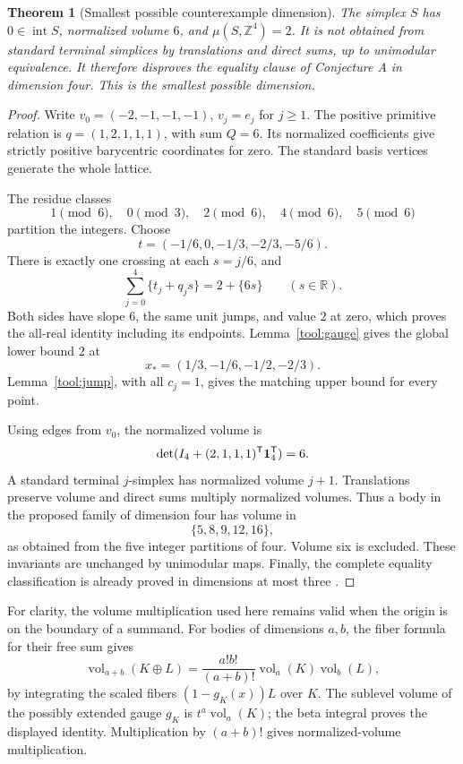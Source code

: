 \documentclass[11pt,a4paper]{article}
\newtheorem{theorem}{Theorem}[section]
\theoremstyle{remark}\newtheorem{remark}[theorem]{Remark}
\DeclareMathOperator{\vol}{vol}
\DeclareMathOperator{\inter}{int}
\newcommand{\R}{\mathbb R}\newcommand{\Z}{\mathbb Z}
\begin{document}
\begin{theorem}[Smallest possible counterexample dimension]\label{thm:S4}
The simplex $S$ has $0\in\inter S$, normalized volume $6$, and
$\mu(S,\Z^4)=2$. It is not obtained from standard terminal simplices
by translations and direct sums, up to unimodular equivalence.
It therefore disproves the equality clause of Conjecture A in
dimension four. This is the smallest possible dimension.
\end{theorem}
\begin{proof}
Write $v_0=(-2,-1,-1,-1)$, $v_j=e_j$ for $j\ge1$. The positive
primitive relation is $q=(1,2,1,1,1)$, with sum $Q=6$. Its normalized
coefficients give strictly positive barycentric coordinates for zero.
The standard basis vertices generate the whole lattice.

The residue classes
\[
 1\pmod6,\quad0\pmod3,\quad2\pmod6,\quad4\pmod6,\quad5\pmod6
\]
partition the integers. Choose
\[
 t=(-1/6,0,-1/3,-2/3,-5/6).
\]
There is exactly one crossing at each $s=j/6$, and
\begin{equation}\label{eq:S4cert}
 \sum_{j=0}^4\{t_j+q_js\}=2+\{6s\}\qquad(s\in\R).
\end{equation}
Both sides have slope $6$, the same unit jumps, and value $2$ at zero,
which proves the all-real identity including its endpoints.
Lemma~\ref{tool:gauge} gives the global lower bound $2$ at
\[
 x_*=(1/3,-1/6,-1/2,-2/3).
\]
Lemma~\ref{tool:jump}, with all $c_j=1$, gives the matching upper bound
for every point.

Using edges from $v_0$, the normalized volume is
\[
 \det(I_4+(2,1,1,1)^{\mathsf T}\mathbf1_4^{\mathsf T})=6.
\]
A standard terminal $j$-simplex has normalized volume $j+1$.
Translations preserve volume and direct sums multiply normalized
volumes. Thus a body in the proposed family of dimension four has
volume in
\[
 \{5,8,9,12,16\},
\]
as obtained from the five integer partitions of four. Volume six is
excluded. These invariants are unchanged by unimodular maps.
Finally, the complete equality classification is already proved
in dimensions at most three \cite[Theorem 1.3]{CSS}.
\end{proof}

For clarity, the volume multiplication used here remains valid when
the origin is on the boundary of a summand. For bodies of dimensions
$a,b$, the fiber formula for their free sum gives
\[
 \vol_{a+b}(K\oplus L)
 =\frac{a!b!}{(a+b)!}\vol_a(K)\vol_b(L),
\]
by integrating the scaled fibers $(1-g_K(x))L$ over $K$.
The sublevel volume of the possibly extended gauge $g_K$ is
$t^a\vol_a(K)$; the beta integral proves the displayed identity.
Multiplication by $(a+b)!$ gives normalized-volume multiplication.
\end{document}
